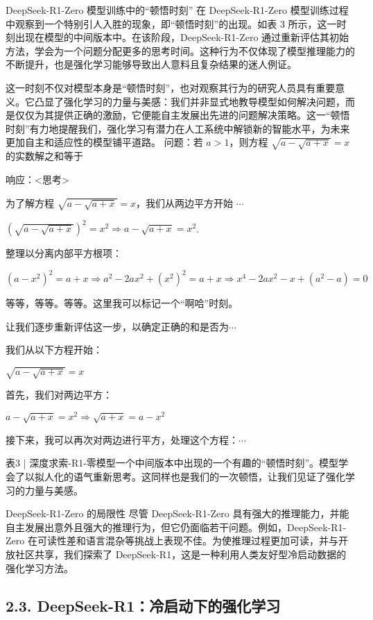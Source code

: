 \documentclass[12pt,a4paper]{report} %
\begin{document}
DeepSeek-R1-Zero 模型训练中的“顿悟时刻” 在 DeepSeek-R1-Zero 模型训练过程中观察到一个特别引人入胜的现象，即“顿悟时刻”的出现。如表 3 所示，这一时刻出现在模型的中间版本中。在该阶段，DeepSeek-R1-Zero 通过重新评估其初始方法，学会为一个问题分配更多的思考时间。这种行为不仅体现了模型推理能力的不断提升，也是强化学习能够导致出人意料且复杂结果的迷人例证。


这一时刻不仅对模型本身是“顿悟时刻”，也对观察其行为的研究人员具有重要意义。它凸显了强化学习的力量与美感：我们并非显式地教导模型如何解决问题，而是仅仅为其提供正确的激励，它便能自主发展出先进的问题解决策略。这一“顿悟时刻”有力地提醒我们，强化学习有潜力在人工系统中解锁新的智能水平，为未来更加自主和适应性的模型铺平道路。
问题：若 $a>1$，则方程 $\sqrt{a-\sqrt{a+x}}=x$ 的实数解之和等于


响应：\textless{}思考\textgreater{}


为了解方程 $\sqrt{a-\sqrt{a+x}}=x$，我们从两边平方开始 $\cdots$


$(\sqrt{a-\sqrt{a+x}})^{2}=x^{2} \Longrightarrow a-\sqrt{a+x}=x^{2}$.


整理以分离内部平方根项：


$\left(a-x^{2}\right)^{2}=a+x \Longrightarrow a^{2}-2 a x^{2}+\left(x^{2}\right)^{2}=a+x \Longrightarrow x^{4}-2 a x^{2}-x+\left(a^{2}-a\right)=0$


等等，等等。等等。这里我可以标记一个“啊哈”时刻。


让我们逐步重新评估这一步，以确定正确的和是否为$\cdots$


我们从以下方程开始：


$\sqrt{a-\sqrt{a+x}}=x$


首先，我们对两边平方：


$a-\sqrt{a+x}=x^{2} \Longrightarrow \sqrt{a+x}=a-x^{2}$


接下来，我可以再次对两边进行平方，处理这个方程：$\cdots$


表3 | 深度求索-R1-零模型一个中间版本中出现的一个有趣的“顿悟时刻”。模型学会了以拟人化的语气重新思考。这同样也是我们的一次顿悟，让我们见证了强化学习的力量与美感。


DeepSeek-R1-Zero 的局限性 尽管 DeepSeek-R1-Zero 具有强大的推理能力，并能自主发展出意外且强大的推理行为，但它仍面临若干问题。例如，DeepSeek-R1-Zero 在可读性差和语言混杂等挑战上表现不佳。为使推理过程更加可读，并与开放社区共享，我们探索了 DeepSeek-R1，这是一种利用人类友好型冷启动数据的强化学习方法。


\subsection*{2.3. DeepSeek-R1：冷启动下的强化学习}
\end{document}
